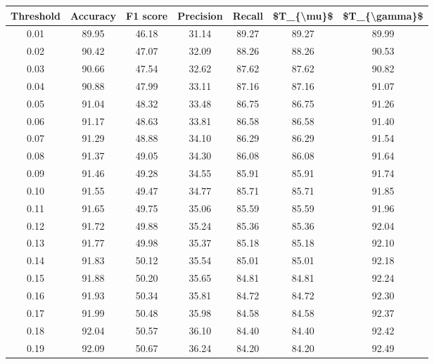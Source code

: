 \begin{tabular}{|c|c|c|c|c|c|c|}
\hline
 Threshold &  Accuracy &  F1 score &  Precision &  Recall &  \$T\_\{\textbackslash mu\}\$ &  \$T\_\{\textbackslash gamma\}\$ \\
\hline
      0.01 &     89.95 &     46.18 &      31.14 &   89.27 &      89.27 &         89.99 \\
      0.02 &     90.42 &     47.07 &      32.09 &   88.26 &      88.26 &         90.53 \\
      0.03 &     90.66 &     47.54 &      32.62 &   87.62 &      87.62 &         90.82 \\
      0.04 &     90.88 &     47.99 &      33.11 &   87.16 &      87.16 &         91.07 \\
      0.05 &     91.04 &     48.32 &      33.48 &   86.75 &      86.75 &         91.26 \\
      0.06 &     91.17 &     48.63 &      33.81 &   86.58 &      86.58 &         91.40 \\
      0.07 &     91.29 &     48.88 &      34.10 &   86.29 &      86.29 &         91.54 \\
      0.08 &     91.37 &     49.05 &      34.30 &   86.08 &      86.08 &         91.64 \\
      0.09 &     91.46 &     49.28 &      34.55 &   85.91 &      85.91 &         91.74 \\
      0.10 &     91.55 &     49.47 &      34.77 &   85.71 &      85.71 &         91.85 \\
      0.11 &     91.65 &     49.75 &      35.06 &   85.59 &      85.59 &         91.96 \\
      0.12 &     91.72 &     49.88 &      35.24 &   85.36 &      85.36 &         92.04 \\
      0.13 &     91.77 &     49.98 &      35.37 &   85.18 &      85.18 &         92.10 \\
      0.14 &     91.83 &     50.12 &      35.54 &   85.01 &      85.01 &         92.18 \\
      0.15 &     91.88 &     50.20 &      35.65 &   84.81 &      84.81 &         92.24 \\
      0.16 &     91.93 &     50.34 &      35.81 &   84.72 &      84.72 &         92.30 \\
      0.17 &     91.99 &     50.48 &      35.98 &   84.58 &      84.58 &         92.37 \\
      0.18 &     92.04 &     50.57 &      36.10 &   84.40 &      84.40 &         92.42 \\
      0.19 &     92.09 &     50.67 &      36.24 &   84.20 &      84.20 &         92.49 \\

\end{tabular}
